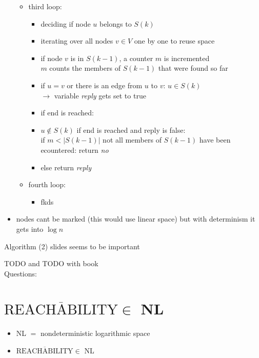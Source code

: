 \documentclass[a4]{scrartcl}
\begin{document}
\begin{itemize}
\begin{itemize}
\item third loop:
\begin{itemize}
\item deciding if node $u$ belongs to $S(k)$
\item iterating over all nodes $v \in V$ one by one to reuse space
\item if node $v$ is in $S(k-1)$, a counter $m$ is incremented \\
$m$ counts the members of $S(k-1)$ that were found so far
\item if $u = v$ or there is an edge from $u$ to $v$: $u \in S(k)$ \\
$\rightarrow$ variable \textit{reply} gets set to true \\
\item if end is reached:
\item $u \notin S(k)$ if end is reached and reply is false: \\
if $m  < |S(k-1)|$ not all members of $S(k-1)$ have been ecountered: return \textit{no}
\item else return \textit{reply} \\
\end{itemize}

\item fourth loop:
\begin{itemize}
\item fkds
\end{itemize}



\end{itemize}

\item nodes cant be marked (this would use linear space) but with determinism it gets into $\log n$ 


\end{itemize}

Algorithm (2) slides seems to be important

\color{red} TODO and TODO with book \\
\color{black}
\color{violet} Questions:
\color{black}




\section*{$\overline{\text{REACHABILITY}} \in$ NL}

\begin{itemize}
\item NL $=$ nondeterministic logarithmic space
\item $\overline{\text{REACHABILITY}} \in$ NL
\end{itemize}
\end{document}
